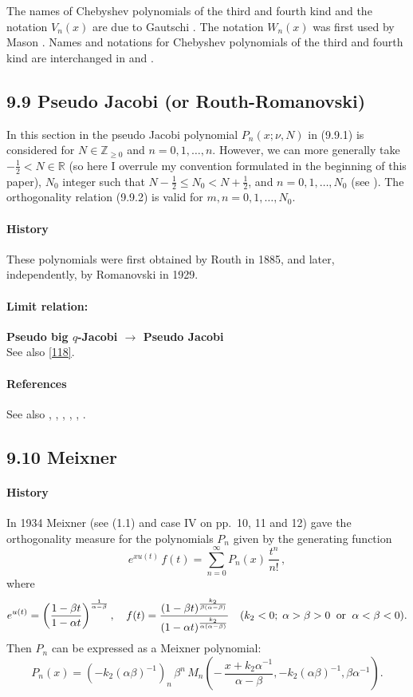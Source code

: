 \documentclass[twoside,11pt]{article}
\newcommand\RR{\mathbb{R}}
\newcommand\ZZ{\mathbb{Z}}
\newcommand\al\alpha
\newcommand\be\beta
\newcommand\thalf{\tfrac12}
\newcommand\iy\infty
\begin{document}
The names of Chebyshev polynomials of the third and fourth kind
and the notation $V_n(x)$ are due to Gautschi \cite{K21}.
The notation $W_n(x)$ was first used by Mason \cite{K22}.
Names and notations for Chebyshev polynomials of the third and fourth
kind are interchanged in  and
.
%
\subsection*{9.9 Pseudo Jacobi (or Routh-Romanovski)}
\label{sec9.9}
In this section in  the pseudo Jacobi polynomial $P_n(x;\nu,N)$ in (9.9.1)
is considered
for $N\in\ZZ_{\ge0}$ and $n=0,1,\ldots,n$. However, we can more generally take
$-\thalf<N\in\RR$ (so here I overrule my convention formulated in the
beginning of this paper), $N_0$ integer such that $N-\thalf\le N_0<N+\thalf$, and $n=0,1,\ldots,N_0$
(see ). The orthogonality relation (9.9.2)
is valid for $m,n=0,1,\ldots,N_0$.
%
\paragraph{History}
These polynomials were first obtained by Routh \cite{K13} in 1885, and later, independently,
by Romanovski  in 1929.
%
\paragraph{Limit relation:}
{\bf Pseudo big $q$-Jacobi $\longrightarrow$ Pseudo Jacobi}\\
See also \eqref{118}.
%
\paragraph{References}
See also , ,
, \cite{K11}, \cite{K10}, \cite{K12}.
%
\subsection*{9.10 Meixner}
\label{sec9.10}
\paragraph{History}
In 1934 Meixner  (see
(1.1) and case IV on pp.~10, 11 and 12) gave the orthogonality
measure for the polynomials $P_n$ given by the generating function
\[
e^{x u(t)}\,f(t)=\sum_{n=0}^\iy P_n(x)\,\frac{t^n}{n!}\,,
\]
where
\[
e^{u(t)}=\left(\frac{1-\be t}{1-\al t}\right)^{\frac1{\al-\be}},\quad
f(t)=\frac{(1-\be t)^{\frac{k_2}{\be(\al-\be)}}}{(1-\al t)^{\frac{k_2}{\al(\al-\be)}}}\quad
(k_2<0;\;\al>\be>0\;\;{\rm or}\;\;\al<\be<0).
\]
Then $P_n$ can be expressed as a Meixner polynomial:
\[
P_n(x)=(-k_2(\al\be)^{-1})_n\,\be^n\,
M_n\left(-\,\frac{x+k_2\al^{-1}}{\al-\be},-k_2(\al\be)^{-1},\be\al^{-1}\right).
\]
\end{document}
